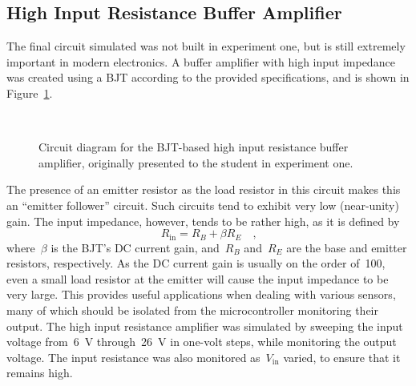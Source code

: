 \subsection{High Input Resistance Buffer Amplifier}
The final circuit simulated was not built in experiment one, but is still
extremely important in modern electronics.  A buffer amplifier with high input
impedance was created using a BJT according to the provided specifications, and
is shown in Figure~\ref{fig:schem5}.
%
\begin{figure}[H]
	\centering
	\\
	\parbox{3.5in}{
	\caption[Schematic --- Buffer Amplifier]{Circuit diagram for the BJT-based
		high input resistance buffer amplifier, originally presented to the student
		in experiment one.}
	\label{fig:schem5}}
\end{figure}
%
The presence of an emitter resistor as the load resistor in this circuit makes
this an ``emitter follower'' circuit.  Such circuits tend to exhibit very low
(near-unity) gain.  The input impedance, however, tends to be rather high, as
it is defined by
%
\begin{equation}
	R_\text{in} = R_B + \beta R_E \quad \text{,}
	\label{eq:rin}
\end{equation}
%
where~$\beta$ is the BJT's DC current gain, and~$R_B$ and~$R_E$ are the base
and emitter resistors, respectively.  As the DC current gain is usually on the
order of~100, even a small load resistor at the emitter will cause the input
impedance to be very large.  This provides useful applications when dealing
with various sensors, many of which should be isolated from the microcontroller
monitoring their output.  The high input resistance amplifier was simulated by
sweeping the input voltage from~\SI{6}{\volt} through~\SI{26}{\volt} in
one-volt steps, while monitoring the output voltage.  The input resistance was
also monitored as~$V_\text{in}$ varied, to ensure that it remains high.
